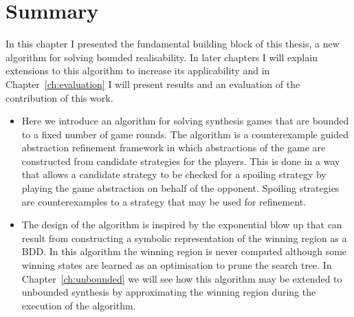 \section{Summary}

In this chapter I presented the fundamental building block of this thesis, a new algorithm for solving bounded realisability. In later chapters I will explain extensions to this algorithm to increase its applicability and in Chapter~\ref{ch:evaluation} I will present results and an evaluation of the contribution of this work.

\begin{itemize}
    \item Here we introduce an algorithm for solving synthesis games that are bounded to a fixed number of game rounds. The algorithm is a counterexample guided abstraction refinement framework in which abstractions of the game are constructed from candidate strategies for the players. This is done in a way that allows a candidate strategy to be checked for a spoiling strategy by playing the game abstraction on behalf of the opponent. Spoiling strategies are counterexamples to a strategy that may be used for refinement.

    \item The design of the algorithm is inspired by the exponential blow up that can result from constructing a symbolic representation of the winning region as a BDD. In this algorithm the winning region is never computed although some winning states are learned as an optimisation to prune the search tree. In Chapter~\ref{ch:unbounded} we will see how this algorithm may be extended to unbounded synthesis by approximating the winning region during the execution of the algorithm.

\end{itemize}




